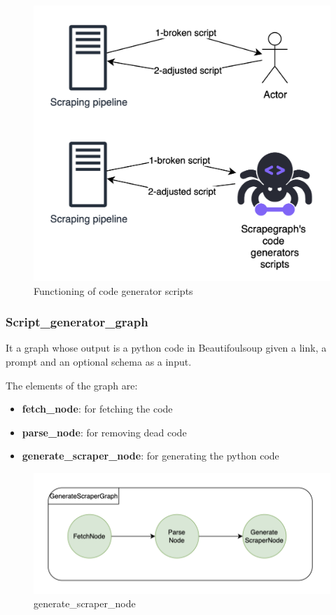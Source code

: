 \begin{figure}[H]
    \centering
    \includegraphics[width=1\linewidth]{Assets/code_generator_scripts.png}
    \caption{Functioning of code generator scripts}
    \label{fig:actually indians}
\end{figure}
\subsubsection{Script\_generator\_graph}
It a graph whose output is a python code in Beautifoulsoup given a link, a prompt and an optional schema as a input.

The elements of the graph are:

\begin{itemize}
    \item \textbf{fetch\_node}: for fetching the code
    \item \textbf{parse\_node}: for removing dead code
    \item \textbf{generate\_scraper\_node}: for generating the python code
\end{itemize}

\begin{figure}
    \centering
    \includegraphics[width=0.85\linewidth]{Assets/generate_script_graph.png}
    \caption{generate\_scraper\_node}
    \label{fig:enter-label}
\end{figure}
